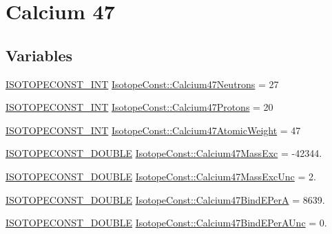 \hypertarget{group___isotope_const-_calcium-_ca47}{}\section{Calcium 47}
\label{group___isotope_const-_calcium-_ca47}
\subsection*{Variables}
\begin{DoxyCompactItemize}
\item 
\mbox{\hyperlink{group___isotope_const-_macros_ga5f18360b3e99483a35c32d789e62621c}{I\+S\+O\+T\+O\+P\+E\+C\+O\+N\+S\+T\+\_\+\+I\+NT}} \mbox{\hyperlink{group___isotope_const-_calcium-_ca47_ga873dafba1992bfde044b6c7c1f88389f}{Isotope\+Const\+::\+Calcium47\+Neutrons}} = 27
\item 
\mbox{\hyperlink{group___isotope_const-_macros_ga5f18360b3e99483a35c32d789e62621c}{I\+S\+O\+T\+O\+P\+E\+C\+O\+N\+S\+T\+\_\+\+I\+NT}} \mbox{\hyperlink{group___isotope_const-_calcium-_ca47_ga7eff2d889d7f385ea3b2b150e07c308e}{Isotope\+Const\+::\+Calcium47\+Protons}} = 20
\item 
\mbox{\hyperlink{group___isotope_const-_macros_ga5f18360b3e99483a35c32d789e62621c}{I\+S\+O\+T\+O\+P\+E\+C\+O\+N\+S\+T\+\_\+\+I\+NT}} \mbox{\hyperlink{group___isotope_const-_calcium-_ca47_ga0b4caba027f0f4057c3232f367fc3885}{Isotope\+Const\+::\+Calcium47\+Atomic\+Weight}} = 47
\item 
\mbox{\hyperlink{group___isotope_const-_macros_ga8f45a7272ce02c0b4c65c44636ed719a}{I\+S\+O\+T\+O\+P\+E\+C\+O\+N\+S\+T\+\_\+\+D\+O\+U\+B\+LE}} \mbox{\hyperlink{group___isotope_const-_calcium-_ca47_gacf86ec2943eda388deaf4a033cecf136}{Isotope\+Const\+::\+Calcium47\+Mass\+Exc}} = -\/42344.
\item 
\mbox{\hyperlink{group___isotope_const-_macros_ga8f45a7272ce02c0b4c65c44636ed719a}{I\+S\+O\+T\+O\+P\+E\+C\+O\+N\+S\+T\+\_\+\+D\+O\+U\+B\+LE}} \mbox{\hyperlink{group___isotope_const-_calcium-_ca47_ga20908adcd6968a516fb1c8893b96e350}{Isotope\+Const\+::\+Calcium47\+Mass\+Exc\+Unc}} = 2.
\item 
\mbox{\hyperlink{group___isotope_const-_macros_ga8f45a7272ce02c0b4c65c44636ed719a}{I\+S\+O\+T\+O\+P\+E\+C\+O\+N\+S\+T\+\_\+\+D\+O\+U\+B\+LE}} \mbox{\hyperlink{group___isotope_const-_calcium-_ca47_gaf51db520e5efad498c929d4b43e5f735}{Isotope\+Const\+::\+Calcium47\+Bind\+E\+PerA}} = 8639.
\item 
\mbox{\hyperlink{group___isotope_const-_macros_ga8f45a7272ce02c0b4c65c44636ed719a}{I\+S\+O\+T\+O\+P\+E\+C\+O\+N\+S\+T\+\_\+\+D\+O\+U\+B\+LE}} \mbox{\hyperlink{group___isotope_const-_calcium-_ca47_ga27eae9b91b71f33bb98e17f043d8da3a}{Isotope\+Const\+::\+Calcium47\+Bind\+E\+Per\+A\+Unc}} = 0.

\end{DoxyCompactItemize}

